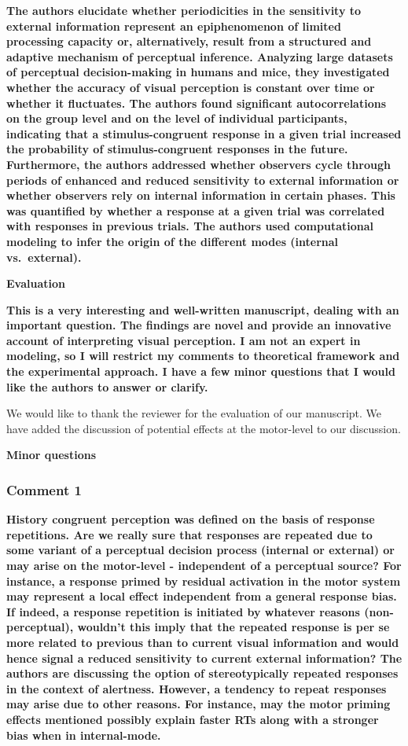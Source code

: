 \documentclass[
]{article}
\begin{document}
\textbf{The authors elucidate whether periodicities in the sensitivity
to external information represent an epiphenomenon of limited processing
capacity or, alternatively, result from a structured and adaptive
mechanism of perceptual inference. Analyzing large datasets of
perceptual decision-making in humans and mice, they investigated whether
the accuracy of visual perception is constant over time or whether it
fluctuates. The authors found significant autocorrelations on the group
level and on the level of individual participants, indicating that a
stimulus-congruent response in a given trial increased the probability
of stimulus-congruent responses in the future. Furthermore, the authors
addressed whether observers cycle through periods of enhanced and
reduced sensitivity to external information or whether observers rely on
internal information in certain phases. This was quantified by whether a
response at a given trial was correlated with responses in previous
trials. The authors used computational modeling to infer the origin of
the different modes (internal vs.~external).}

\textbf{Evaluation}

\textbf{This is a very interesting and well-written manuscript, dealing
with an important question. The findings are novel and provide an
innovative account of interpreting visual perception. I am not an expert
in modeling, so I will restrict my comments to theoretical framework and
the experimental approach. I have a few minor questions that I would
like the authors to answer or clarify.}

We would like to thank the reviewer for the evaluation of our
manuscript. We have added the discussion of potential effects at the
motor-level to our discussion.

\textbf{Minor questions}

\hypertarget{comment-1-1}{%
\subsubsection{Comment 1}\label{comment-1-1}}

\textbf{History congruent perception was defined on the basis of
response repetitions. Are we really sure that responses are repeated due
to some variant of a perceptual decision process (internal or external)
or may arise on the motor-level - independent of a perceptual source?
For instance, a response primed by residual activation in the motor
system may represent a local effect independent from a general response
bias. If indeed, a response repetition is initiated by whatever reasons
(non-perceptual), wouldn't this imply that the repeated response is per
se more related to previous than to current visual information and would
hence signal a reduced sensitivity to current external information? The
authors are discussing the option of stereotypically repeated responses
in the context of alertness. However, a tendency to repeat responses may
arise due to other reasons. For instance, may the motor priming effects
mentioned possibly explain faster RTs along with a stronger bias when in
internal-mode.}
\end{document}
